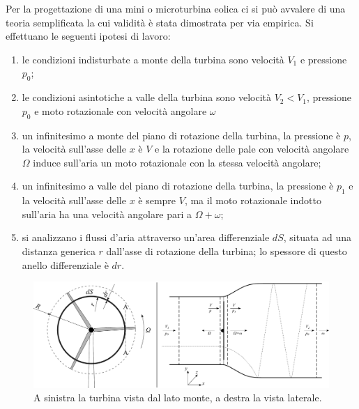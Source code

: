 Per la progettazione di una mini o microturbina eolica ci si può avvalere di una teoria semplificata la cui validità è stata dimostrata per via empirica. Si effettuano le seguenti ipotesi di lavoro:
\begin{enumerate}
\item le condizioni indisturbate a monte della turbina sono velocità $V_1$ e pressione $p_0$;
\item le condizioni asintotiche a valle della turbina sono velocità $V_2 < V_1$, pressione $p_0$ e moto rotazionale con velocità angolare $\omega$
\item un infinitesimo a monte del piano di rotazione della turbina, la pressione è $p$, la velocità sull'asse delle $x$ è $V$ e la rotazione delle pale con velocità angolare $\Omega$ induce sull'aria un moto rotazionale con la stessa velocità angolare;
\item un infinitesimo a valle del piano di rotazione della turbina, la pressione è $p_1$ e la velocità sull'asse delle $x$ è sempre $V$, ma il moto rotazionale indotto sull'aria ha una velocità angolare pari a $\Omega+\omega$;
\item si analizzano i flussi d'aria attraverso un'area differenziale $dS$, situata ad una distanza generica $r$ dall'asse di rotazione della turbina; lo spessore di questo anello differenziale è $dr$.
\end{enumerate}
\begin{figure}
\centering
  \includegraphics[width=\textwidth]{fig/frontlatEol.pdf}
\caption{A sinistra la turbina vista dal lato monte, a destra la vista laterale.}
\label{fig:frontlatEol}
\end{figure}
